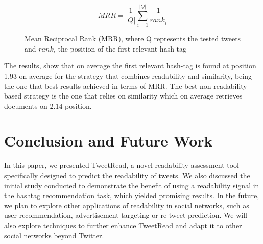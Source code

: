 \documentclass{sig-alternate-05-2015}
\begin{document}
\begin{figure}[h]
\[ MRR = \frac{1}{|Q|} \sum^{|Q|}_{i=1} \frac{1}{rank_i} \]
\caption{Mean Reciprocal Rank (MRR), where Q represents the tested tweets and $rank_i$ the position of the first relevant hash-tag}
\label{fig:flesh}
\end{figure}

The results, show that on average  the first relevant hash-tag is found at position 1.93 on average for the strategy that combines readability and similarity, being the one that best results achieved in terms of MRR. The best non-readability based strategy is the one that relies on similarity which on average retrieves documents on 2.14 position.


\section{Conclusion and Future Work}
In this paper, we presented TweetRead, a novel readability assessment tool specifically designed to predict the readability of tweets. We also discussed the initial study conducted to demonstrate the benefit of using a readability signal in the hashtag recommendation task, which yielded promising results.
In the future, we plan to explore other applications of readability in social networks, such as user recommendation, advertisement targeting or re-tweet prediction. We will also explore techniques to further enhance TweetRead and adapt it to other social networks beyond Twitter.

%

%
%
\end{document}

